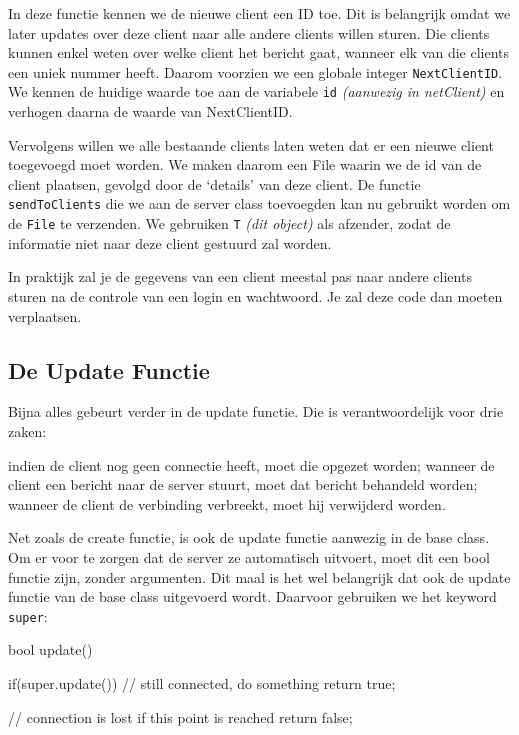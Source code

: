 In deze functie kennen we de nieuwe client een ID toe. Dit is belangrijk omdat we later updates over deze client naar alle andere clients willen sturen. Die clients kunnen enkel weten over welke client het bericht gaat, wanneer elk van die clients een uniek nummer heeft. Daarom voorzien we een globale integer \texttt{NextClientID}. We kennen de huidige waarde toe aan de variabele \texttt{id} \textsl{(aanwezig in netClient)} en verhogen daarna de waarde van NextClientID.

Vervolgens willen we alle bestaande clients laten weten dat er een nieuwe client toegevoegd moet worden. We maken daarom een File waarin we de id van de client plaatsen, gevolgd door de `details' van deze client. De functie \texttt{sendToClients} die we aan de server class toevoegden kan nu gebruikt worden om de \texttt{File} te verzenden. We gebruiken \texttt{T} \textsl{(dit object)} als afzender, zodat de informatie niet naar deze client gestuurd zal worden.

\begin{note}
In praktijk zal je de gegevens van een client meestal pas naar andere clients sturen na de controle van een login en wachtwoord. Je zal deze code dan moeten verplaatsen.
\end{note}

\subsection{De Update Functie}

Bijna alles gebeurt verder in de update functie. Die is verantwoordelijk voor drie zaken:
\begin{itemize}
\tick indien de client nog geen connectie heeft, moet die opgezet worden;
\tick wanneer de client een bericht naar de server stuurt, moet dat bericht behandeld worden;
\tick wanneer de client de verbinding verbreekt, moet hij verwijderd worden.
\end{itemize}

Net zoals de create functie, is ook de update functie aanwezig in de base class. Om er voor te zorgen dat de server ze automatisch uitvoert, moet dit een bool functie zijn, zonder argumenten. Dit maal is het wel belangrijk dat ook de update functie van de base class uitgevoerd wordt. Daarvoor gebruiken we het keyword \texttt{super}:

\begin{code}
bool update() 
{
  if(super.update()) {
	  // still connected, do something
		return true;
	} 
	
	// connection is lost if this point is reached
	return false;	
}
\end{code}

